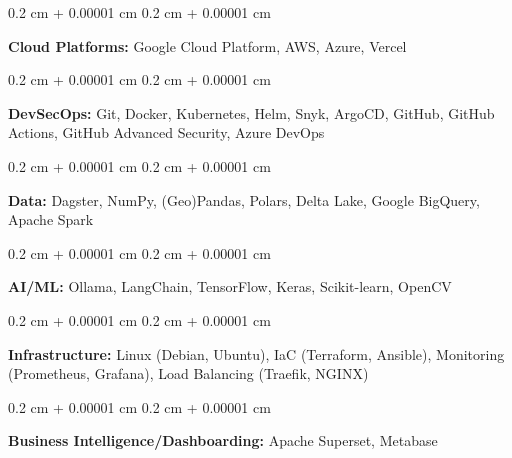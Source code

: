 \documentclass[10pt, a4paper]{article}
\newenvironment{onecolentry}{
    \begin{adjustwidth}{
        0.2 cm + 0.00001 cm
    }{
        0.2 cm + 0.00001 cm
    }
}{
    \end{adjustwidth}
} %
\begin{document}
        \begin{onecolentry}
            \textbf{Cloud Platforms:} Google Cloud Platform, AWS, Azure, Vercel
        \end{onecolentry}

        \vspace{0.2 cm}

        \begin{onecolentry}
            \textbf{DevSecOps:} Git, Docker, Kubernetes, Helm, Snyk, ArgoCD, GitHub, GitHub Actions, GitHub Advanced Security, Azure DevOps

        \end{onecolentry}

        \vspace{0.2 cm}

        \begin{onecolentry}
            \textbf{Data:} Dagster, NumPy, (Geo)Pandas, Polars, Delta Lake, Google BigQuery, Apache Spark
        \end{onecolentry}

        \vspace{0.2 cm}

        \begin{onecolentry}
            \textbf{AI/ML:} Ollama, LangChain, TensorFlow, Keras, Scikit-learn, OpenCV
        \end{onecolentry}

        \vspace{0.2 cm}

        \begin{onecolentry}
            \textbf{Infrastructure:} Linux (Debian, Ubuntu), IaC (Terraform, Ansible), Monitoring (Prometheus, Grafana),  Load Balancing (Traefik, NGINX)

        \end{onecolentry}

        \vspace{0.2 cm}

        \begin{onecolentry}
            \textbf{Business Intelligence/Dashboarding:} Apache Superset, Metabase
        \end{onecolentry}


    
\end{document}
